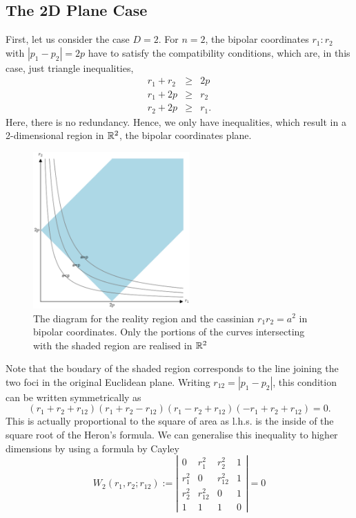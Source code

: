 \documentclass{article}
\begin{document}
\subsection{The 2D Plane Case}
\label{sec-1-4}
First, let us consider the case $D=2$. For $n=2$, the bipolar coordinates $r_1 :r_2$ with $|p_1 -p_2| =2p$ have to satisfy the compatibility conditions, which are, in this case, just triangle inequalities,
\begin{eqnarray}
 r_1 + r_2 & \ge & 2p \\
 r_1 +2p  & \ge & r_2  \\
 r_2 +2p  & \ge & r_1 .
\end{eqnarray}
Here, there is no redundancy. Hence, we only have inequalities, which result in a 2-dimensional region in $\mathbb R^2$, the bipolar coordinates plane.
\begin{figure}[h]
\begin{center}
\includegraphics[width=6cm]{2cass_bipo.eps}
\caption{The diagram for the reality region and the cassinian $r_1r_2=a^2$ in bipolar coordinates. Only the portions of the curves intersecting with the shaded region are realised in $\mathbb R^2$}
\label{ }
\end{center}
\end{figure}
Note that the boudary of the shaded region corresponds to the line joining the two foci in the original Euclidean plane. Writing $r_{12}=|p_1 -p_2|$, this condition can be written symmetrically as
\begin{equation}
\label{}
( r_1 + r_2 + r_{12})(r_1 + r_2 - r_{12})(r_1 - r_2 + r_{12})(-r_1 + r_2 + r_{12}) = 0.
\end{equation}
This is actually proportional to the square of area as l.h.s. is the inside of the square root of the Heron's formula. We can generalise this inequality to higher dimensions by using a formula by Cayley
\begin{equation}
\label{}
W_2(r_1,r_2;r_{12}) :=   \left|
\begin{array}{cccc}
0 &  r_1^2 & r_2^2 & 1 \\
r_1^2 & 0 & r_{12}^2 & 1\\
r_2^2 & r_{12}^2 & 0 & 1 \\
1 & 1 & 1 & 0
\end{array}\right|=0
\end{equation}
\end{document}
